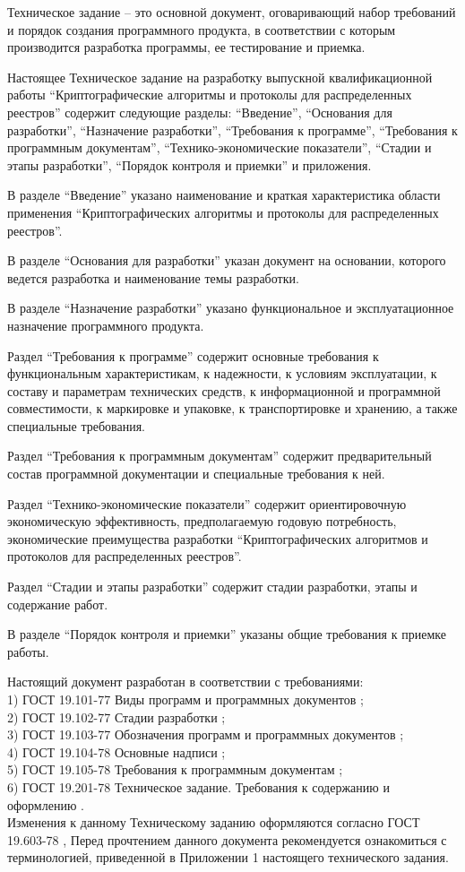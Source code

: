 \tab[0.75cm] Техническое задание – это основной документ, оговаривающий набор требований и
порядок создания программного продукта, в соответствии с которым производится разработка
программы, ее тестирование и приемка.

Настоящее Техническое задание на разработку выпускной квалификационной работы
``Криптографические алгоритмы и протоколы для распределенных реестров''
содержит следующие разделы: ``Введение'', ``Основания для разработки'',
``Назначение разработки'', ``Требования к программе'', ``Требования к
программным документам'', ``Технико-экономические показатели'', ``Стадии и
этапы разработки'', ``Порядок контроля и приемки'' и приложения.

В разделе ``Введение'' указано наименование и краткая характеристика области применения
``Криптографических алгоритмы и протоколы для распределенных реестров''.

В разделе ``Основания для разработки'' указан документ на основании, которого ведется
разработка и наименование темы разработки.

В разделе ``Назначение разработки'' указано функциональное и эксплуатационное
назначение программного продукта.

Раздел ``Требования к программе'' содержит основные требования к функциональным
характеристикам, к надежности, к условиям эксплуатации, к составу и параметрам технических
средств, к информационной и программной совместимости, к маркировке и упаковке, к
транспортировке и хранению, а также специальные требования.

Раздел ``Требования к программным документам'' содержит предварительный состав
программной документации и специальные требования к ней.

Раздел ``Технико-экономические показатели'' содержит ориентировочную экономическую
эффективность, предполагаемую годовую потребность, экономические преимущества разработки
``Криптографических алгоритмов и протоколов для распределенных реестров''.

Раздел ``Стадии и этапы разработки'' содержит стадии разработки, этапы и содержание
работ.

В разделе ``Порядок контроля и приемки'' указаны общие требования к приемке работы.

Настоящий документ разработан в соответствии с требованиями:\\
1) ГОСТ 19.101-77 Виды программ и программных документов \cite{gost_types_of_software};\\
2) ГОСТ 19.102-77 Стадии разработки \cite{gost_stages_of_devel};\\
3) ГОСТ 19.103-77 Обозначения программ и программных документов \cite{gost_marking_software};\\
4) ГОСТ 19.104-78 Основные надписи \cite{gost_main_signs};\\
5) ГОСТ 19.105-78 Требования к программным документам \cite{gost_demands_for_docs};\\
6) ГОСТ 19.201-78 Техническое задание. Требования к содержанию и оформлению \cite{gost_tz}.\\

Изменения к данному Техническому заданию оформляются согласно ГОСТ 19.603-78 \cite{gost_main_rules_change},
Перед прочтением данного документа рекомендуется ознакомиться с терминологией,
приведенной в Приложении 1 настоящего технического задания.

